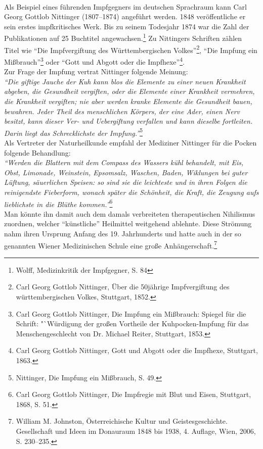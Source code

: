 \documentclass[
    a4paper,
    12pt,
    hyphens,
    chapterprefix=true,
    headheight=33pt,
    footheight=29pt,
    headings=optiontohead, %
]{scrartcl}
\begin{document}
\\
Als Beispiel eines führenden Impfgegners im deutschen Sprachraum kann Carl Georg Gottlob Nittinger (1807--1874) angeführt werden. 1848 veröffentliche er sein erstes impfkritisches Werk. Bis zu seinem Todesjahr 1874 war die Zahl der Publikationen auf 25 Buchtitel angewachsen.\footnote{Wolff, Medizinkritik der Impfgegner, S. 84} Zu Nittingers Schriften zählen Titel wie "`Die Impfvergiftung des Württembergischen Volkes"'\footnote{Carl Georg Gottlob Nittinger, Über die 50jährige Impfvergiftung des württembergischen Volkes, Stuttgart, 1852.}, "`Die Impfung ein Mißbrauch"'\footnote{Carl Georg Gottlob Nittinger, Die Impfung ein Mißbrauch: Spiegel für die Schrift: "`Würdigung der großen Vortheile der Kuhpocken-Impfung für das Menschengeschlecht von Dr. Michael Reiter, Stuttgart, 1853.} oder "`Gott und Abgott oder die Impfhexe"'\footnote{Carl Georg Gottlob Nittinger, Gott und Abgott oder die Impfhexe, Stuttgart, 1863.}. \\
Zur Frage der Impfung vertrat Nittinger folgende Meinung: \\
\textit{"`Die giftige Jauche der Kuh kann blos die Elemente zu einer neuen Krankheit abgeben, die Gesundheit vergiften, oder die Elemente einer Krankheit vermehren, die Krankheit vergiften; nie aber werden kranke Elemente die Gesundheit bauen, bewahren. Jeder Theil des menschlichen Körpers, der eine Ader, einen Nerv besitzt, kann dieser Ver- und Uebergiftung verfallen und kann dieselbe fortleiten. Darin liegt das Schrecklichste der Impfung."'}\footnote{Nittinger, Die Impfung ein Mißbrauch, S. 49.}\\
Als Vertreter der Naturheilkunde empfahl der Mediziner Nittinger für die Pocken folgende Behandlung: \\
\textit{"`Werden die Blattern mit dem Compass des Wassers kühl behandelt, mit Eis, Obst, Limonade, Weinstein, Epsomsalz, Waschen, Baden, Wiklungen bei guter Lüftung, säuerlichen Speisen: so sind sie die leichteste und in ihren Folgen die reinigendste Fieberform, wonach später die Schönheit, die Kraft, die Zeugung aufs lieblichste in die Blüthe kommen."'}\footnote{Carl Georg Gottlob Nittinger, Die Impfregie mit Blut und Eisen, Stuttgart, 1868, S. 51.}\\
Man könnte ihn damit auch dem damals verbreiteten therapeutischen Nihilismus zuordnen, welcher "`künstliche"' Heilmittel weitgehend ablehnte. Diese Strömung nahm ihren Ursprung Anfang des 19. Jahrhunderts und hatte auch in der so genannten Wiener Medizinischen Schule eine große Anhängerschaft.\footnote{William M. Johnston, Österreichische Kultur und Geistesgeschichte. Gesellschaft und Ideen im Donauraum 1848 bis 1938, 4. Auflage, Wien, 2006, S. 230--235.} \\
\end{document}
